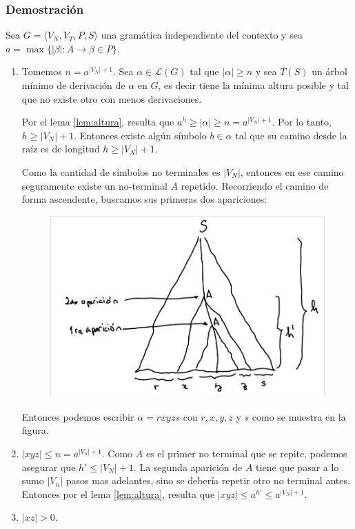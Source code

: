 \subsubsection{Demostración}
Sea \(G=\langle V_N, V_T, P, S \rangle\) una gramática independiente del contexto y sea \(a = \max\{|\beta|: A\to\beta\in P\}\).

\begin{enumerate}
  \item Tomemos \(n = a^{|V_N|+1}\). Sea \(\alpha\in\mathcal{L}(G)\) tal que \(|\alpha|\geq n\) y sea \(T(S)\) un árbol mínimo de derivación de \(\alpha\) en \(G\), es decir tiene la mínima altura posible y tal que no existe otro con menos derivaciones.

        Por el lema \ref{lem:altura}, resulta que \(a^h\geq |\alpha|\geq n = a^{|V_N|+1}\). Por lo tanto, \(h\geq |V_N|+1\). Entonces existe algún símbolo \(b\in\alpha\) tal que su camino desde la raíz es de longitud  \(h\geq|V_N|+1\).

        Como la cantidad de símbolos no terminales es \(|V_N|\), entonces en ese camino seguramente existe un no-terminal \(A\) repetido. Recorriendo el camino de forma ascendente, buscamos sus primeras dos apariciones:

        \begin{figure}[H]
          \begin{center}
            \includegraphics[scale=0.3]{imagenes/gic.pumping.tree.png}
          \end{center}
        \end{figure}

        Entonces podemos escribir \(\alpha=rxyzs\) con \(r,x,y,z\) y \(s\) como se muestra en la figura.
  \item \(|xyz|\leq n = a^{|V_n| + 1}\).
        Como \(A\) es el primer no terminal que se repite, podemos asegurar que \(h' \leq |V_N| + 1\). La segunda aparición de \(A\) tiene que pasar a lo sumo \(|V_n|\) pasos mas adelantes, sino se debería repetir otro no terminal antes. Entonces por el lema \ref{lem:altura}, resulta que \(|xyz|\leq a^{h'}\leq a^{|V_N|+1}\).
  \item \(|xz| > 0\).


\end{enumerate}
